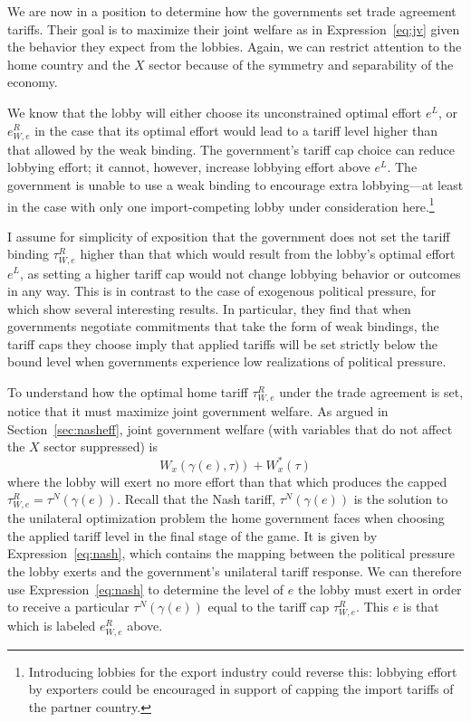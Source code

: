 \documentclass[12pt]{article}
\newcommand{\ga}{\gamma}
\begin{document}
We are now in a position to determine how the governments set trade agreement tariffs. Their goal is to maximize their joint welfare as in Expression~\ref{eq:jv} given the behavior they expect from the lobbies. Again, we can restrict attention to the home country and the $X$ sector because of the symmetry and separability of the economy.

We know that the lobby will either choose its unconstrained optimal effort $e^L$, or $e^R_{W,e}$ in the case that its optimal effort would lead to a tariff level higher than that allowed by the weak binding. The government's tariff cap choice can reduce lobbying effort; it cannot, however, increase lobbying effort above $e^L$. The government is unable to use a weak binding to encourage extra lobbying---at least in the case with only one import-competing lobby under consideration here.\footnote{Introducing lobbies for the export industry could reverse this: lobbying effort by exporters could be encouraged in support of capping the import tariffs of the partner country.}

I assume for simplicity of exposition that the government does not set the tariff binding $\tau^R_{W,e}$ higher than that which would result from the lobby's optimal effort $e^L$, as setting a higher tariff cap would not change lobbying behavior or outcomes in any way. This is in contrast to the case of exogenous political pressure, for which \Textcite{bs2005} show several interesting results. In particular, they find that when governments negotiate commitments that take the form of weak bindings, the tariff caps they choose imply that applied tariffs will be set strictly below the bound level when governments experience low realizations of political pressure.

To understand how the optimal home tariff $\tau^R_{W,e}$ under the trade agreement is set, notice that it must maximize joint government welfare. As argued in Section~\ref{sec:nasheff}, joint government welfare (with variables that do not affect the $X$ sector suppressed) is
  \begin{equation}
		W_x \left(\ga(e),\tau) \right) + W_x^*\left(\tau \right)
	  \label{exp:1}
	\end{equation}
where the lobby will exert no more effort than that which produces the capped $\tau^R_{W,e}=\tau^N(\ga(e))$. Recall that the Nash tariff, $\tau^N(\ga(e))$ is the solution to the unilateral optimization problem the home government faces when choosing the applied tariff level in the final stage of the game. It is given by Expression~\ref{eq:nash}, which contains the mapping between the political pressure the lobby exerts and the government's unilateral tariff response. We can therefore use Expression~\ref{eq:nash} to determine the level of $e$ the lobby must exert in order to receive a particular $\tau^N(\ga(e))$ equal to the tariff cap $\tau^R_{W,e}$. This $e$ is that which is labeled $e^R_{W,e}$ above.
\end{document}
